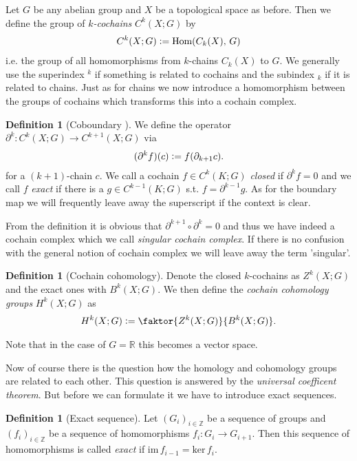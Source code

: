\documentclass[12pt,a4paper]{article}
\numberwithin{equation}{subsection}
\numberwithin{lemma}{subsection}
\theoremstyle{definition}
\newtheorem{definition}[lemma]{Definition}
\newcommand{\integers}{\mathbb{Z}}
\newcommand{\real}{\mathbb{R}}
\begin{document}
Let $G$ be any abelian group and $X$ be a topological space as before. 
Then we define the group 
of \textit{$k$-cochains} $C^k(X;G)$ by
\begin{align*}
    C^k(X;G) \vcentcolon= \text{Hom}(C_k(X),\,G)
\end{align*}
i.e. the group of all homomorphisms from $k$-chains $C_k(X)$ to $G$. 
We generally use the superindex $^k$ if something is related to 
cochains and the subindex $_k$ if it is related to chains. 
Just as for chains we now introduce a homomorphism between the groups of cochains
which transforms this into a cochain complex.
\begin{definition}[Coboundary ]
    We define the operator $\partial^k: C^k(X;G) \rightarrow C^{k+1}(X;G)$ via
    \begin{align*}
        (\partial^k f) (c) \vcentcolon= f(\partial_{k+1} c).
    \end{align*}
    for a $(k+1)$-chain $c$.
    We call a cochain $f \in C^k(K;G)$ \textit{closed} if $\partial^k f = 0$ 
    and we call $f$
    \textit{exact} if there is a $g \in C^{k-1}(K;G)$ s.t. $f = \partial^{k-1} g$.
    As for the boundary map we will frequently leave away the superscript if
    the context is clear.
\end{definition}
From the definition it is obvious that $\partial^{k+1} \circ \partial^{k} = 0$ 
and thus we have indeed a cochain complex which we call \textit{singular cochain 
complex}. If there is no confusion with the general notion of cochain complex
we will leave away the term 'singular'.
\begin{definition}[Cochain cohomology]
    Denote the closed $k$-cochains as $Z^k(X;G)$ and the 
    exact ones with $B^k(X;G)$. 
    We then define the \textit{cochain cohomology groups}
    $H^k(X;G)$ as
    \begin{align*}
        H^k(X;G) \vcentcolon= \faktor{Z^k(X;G)}{B^k(X;G)}.
    \end{align*}
\end{definition}
Note that in the case of $G = \real$ this becomes a vector space.

Now of course there is the question how the homology and cohomology groups 
are related to each other. This question is answered by the
\textit{universal coefficent theorem}. But before we can formulate it we have 
to introduce exact sequences.
\begin{definition}[Exact sequence]
    Let $(G_i)_{i\in \integers}$ be a sequence of groups and 
    $(f_i)_{i \in \integers}$ be a sequence of homomorphisms
    $f_i: G_i \rightarrow G_{i+1}$. Then this sequence of homomorphisms is
    called \textit{exact} if $\text{im}\,f_{i-1} = \text{ker}\,f_i$.
\end{definition}
\end{document}
